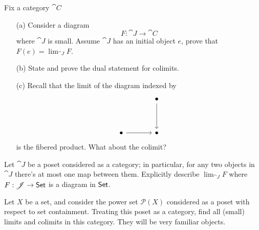 \begin{problem}\label{prob 7.1}
Fix a category $\cat{C}$
\begin{itemize}
\item[(a)] Consider a diagram
\[F:\cat{J} \to \cat{C}\]
where $\cat{J}$ is small. Assume $\cat{J}$ has an initial object $e$, prove that $F(e) = \lim_{\cat{J}}F$.
\item[(b)] State and prove the dual statement for colimits.
\item[(c)] Recall that the limit of the diagram indexed by
\[\begin{tikzcd}[row sep=huge, column sep = large]
 & \bullet \arrow[d] \\
\bullet \arrow[r]                                              & \bullet               
\end{tikzcd}\]
is the fibered product. What about the colimit?
\end{itemize}
\end{problem}

\vspace{0.1in}

\begin{problem}\label{prob 7.2}
Let $\cat{J}$ be a poset considered as a category; in particular, for any two objects in $\cat{J}$ there's at most one map between them. Explicitly describe $\lim_{\cat{J}}F$ where $F:\mathscr{J} \to \mathsf{Set}$ is a diagram in $\mathsf{Set}$.
\end{problem}

\vspace*{0.1in}

\begin{problem}\label{prob 7.3}
Let $X$ be a set, and consider the power set $\mathscr{P}(X)$ considered as a poset with respect to set containment. Treating this poset as a category, find all (small) limits and colimits in this category. They will be very familiar objects. 
\end{problem}

\vspace*{0.1in}

